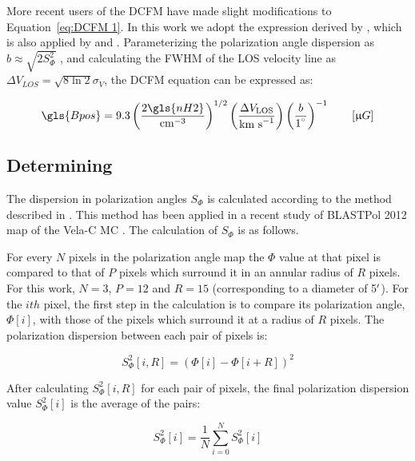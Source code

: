More recent users of the DCFM have made slight modifications to Equation~\ref{eq:DCFM 1}. In this work we adopt the expression derived by \citet{hildebrand2009dispersion}, which is also applied by \citet{crutcher2004scuba} and \citet{franco2015tracing}. Parameterizing the polarization angle dispersion as $b \approx \sqrt{2 S^{2}_{\Phi}}$ \citep{houde2009dispersion}, and calculating the FWHM of the LOS velocity line as $\Delta V_{LOS} = \sqrt{8 \ln 2} \sigma_{V}$, the DCFM equation can be expressed as:

 \begin{equation}\label{eq:DCFM 2}
    \gls{Bpos} = 9.3 \left( \frac{2\gls{nH2}}{\text{cm}^{-3}}  \right)^{1/2} \left( \frac{\Delta V_{\mathrm{LOS}}}{\text{km s}^{-1}} \right)  \left(  \frac{b}{1^{\degree}}\right)^{-1} \qquad \left[ \upmu G \right]
 \end{equation}

\subsection{Determining }\label{pol disp}

The dispersion in polarization angles $S_{\Phi}$ is calculated according to the method described in \citet{ade2015planck}. This method has been applied in a recent study of BLASTPol 2012 map of the Vela-C MC \citep{fissel2016balloon}. The calculation of $S_{\Phi}$ is as follows.

For every $N$ pixels in the polarization angle map the $\Phi$ value at that pixel is compared to that of $P$ pixels which surround it in an annular radius of $R$ pixels. For this work, $N = 3$, $P = 12$ and $R = 15$ (corresponding to a diameter of 5$\operatorname{^{\prime}}$). For the $ith$ pixel, the first step in the calculation is to compare its polarization angle, $\Phi[i]$, with those of the pixels which surround it at a radius of $R$ pixels. The polarization dispersion between each pair of pixels is:

\begin{equation}
  S^{2}_{\Phi}[i,R] = \left( \Phi[i] - \Phi[i + R] \right)^{2}
\end{equation}

After calculating $S^{2}_{\Phi}[i,R]$ for each pair of pixels, the final polarization dispersion value $S^{2}_{\Phi}[i]$ is the average of the pairs:

\begin{equation}
  S^{2}_{\Phi}[i] = \frac{1}{N} \sum\limits_{i=0}^{N} S^{2}_{\Phi}[i]
\end{equation}

